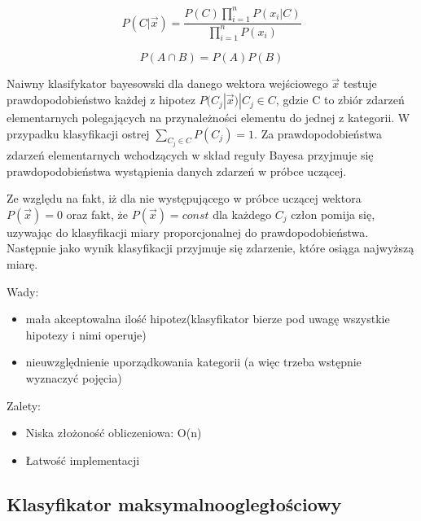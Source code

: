 \documentclass[12pt,a4paper,oneside]{report} %
\begin{document}
\begin{equation}
P(C|\vec{x}) = \frac{P(C)\prod\limits_{i=1}^n{P(x_i|C)}}{\prod\limits_{i=1}^n{P({x_i})}}
\end{equation}
\label{ppimplikacji}

\begin{equation}
P(A \cap B) = P(A)P(B)
\end{equation}
\label{niezaleznosc}

Naiwny klasifykator bayesowski dla danego wektora wejściowego $\vec{x}$ testuje prawdopodobieństwo każdej z hipotez $P(C_j|\vec{x}) | C_j \in C$, gdzie C to zbiór zdarzeń elementarnych polegających na przynależności elementu do jednej z kategorii. W przypadku klasyfikacji ostrej $\sum\limits_{C_j \in C} P(C_j) = 1 $. Za prawdopodobieństwa zdarzeń elementarnych wchodzących w skład reguły Bayesa przyjmuje się prawdopodobieństwa wystąpienia danych zdarzeń w próbce uczącej. \par

Ze względu na fakt, iż dla nie występującego w próbce uczącej wektora $P(\vec{x}) = 0$ oraz fakt, że $P(\vec{x})=const$ dla każdego $C_j$ człon pomija się, uzywając do klasyfikacji miary proporcjonalnej do prawdopodobieństwa. Następnie jako wynik klasyfikacji przyjmuje się zdarzenie, które osiąga najwyższą miarę.\par
\vspace{0.5cm}
Wady:\par
\begin{itemize}
\item mała akceptowalna ilość hipotez(klasyfikator bierze pod uwagę wszystkie hipotezy i nimi operuje)
\item nieuwzględnienie uporządkowania kategorii (a więc trzeba wstępnie wyznaczyć pojęcia)
\end{itemize}\par
Zalety:\par
\begin{itemize}
\item Niska złożoność obliczeniowa: O(n)
\item Łatwość implementacji
\end{itemize}\par






\subsection{Klasyfikator maksymalnoogległościowy}
\end{document}
